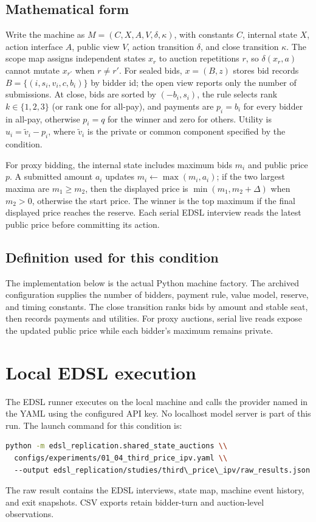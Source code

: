 \documentclass[11pt]{article}
\begin{document}
\subsection{Mathematical form}
Write the machine as $M=(C,X,A,V,\delta,\kappa)$, with constants $C$,
internal state $X$, action interface $A$, public view $V$, action transition
$\delta$, and close transition $\kappa$. The scope map assigns independent
states $x_r$ to auction repetitions $r$, so $\delta(x_r,a)$ cannot mutate
$x_{r'}$ when $r\ne r'$. For sealed bids, $x=(B,z)$ stores bid records
$B=\{(i,s_i,v_i,c,b_i)\}$ by bidder id; the open view reports only the
number of submissions. At close, bids are sorted by $(-b_i,s_i)$, the rule
selects rank $k\in\{1,2,3\}$ (or rank one for all-pay), and payments are
$p_i=b_i$ for every bidder in all-pay, otherwise $p_i=q$ for the winner and
zero for others. Utility is $u_i=\tilde v_i-p_i$, where $\tilde v_i$ is
the private or common component specified by the condition.

For proxy bidding, the internal state includes maximum bids $m_i$ and public
price $p$. A submitted amount $a_i$ updates $m_i\leftarrow\max(m_i,a_i)$;
if the two largest maxima are $m_1\ge m_2$, then the displayed price
is $\min(m_1,m_2+\Delta)$ when $m_2>0$, otherwise the start
price. The winner is the top maximum if the final displayed price reaches the
reserve. Each serial EDSL interview reads the latest public price before
committing its action.

\subsection{Definition used for this condition}
The implementation below is the actual Python machine factory. The archived
configuration supplies the number of bidders, payment rule, value model, reserve,
and timing constants. The close transition ranks bids by amount and stable seat,
then records payments and utilities. For proxy auctions, serial live reads expose
the updated public price while each bidder's maximum remains private.


\section{Local EDSL execution}
The EDSL runner executes on the local machine and calls the provider named in the
YAML using the configured API key. No localhost model server is part of this run.
The launch command for this condition is:
\begin{lstlisting}[language=bash]
python -m edsl_replication.shared_state_auctions \\
  configs/experiments/01_04_third_price_ipv.yaml \\
  --output edsl_replication/studies/third\_price\_ipv/raw_results.json
\end{lstlisting}
The raw result contains the EDSL interviews, state map, machine event history, and
exit snapshots. CSV exports retain bidder-turn and auction-level observations.
\end{document}
